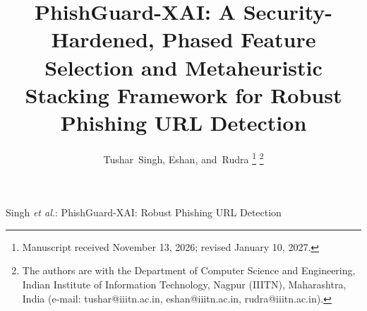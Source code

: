 \documentclass[journal]{IEEEtran}
\begin{document}
\title{PhishGuard-XAI: A Security-Hardened, Phased Feature Selection and Metaheuristic Stacking Framework for Robust Phishing URL Detection}

\author{Tushar~Singh,
        Eshan,
        and~Rudra%
\thanks{Manuscript received November 13, 2026; revised January 10, 2027.}
\thanks{The authors are with the Department of Computer Science and Engineering, Indian Institute of Information Technology, Nagpur (IIITN), Maharashtra, India (e-mail: tushar@iiitn.ac.in, eshan@iiitn.ac.in, rudra@iiitn.ac.in).}}

%
{Singh \MakeLowercase{\textit{et al.}}: PhishGuard-XAI: Robust Phishing URL Detection}

\maketitle
\end{document}
